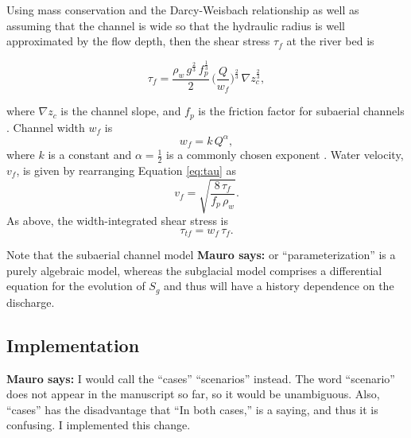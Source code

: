\documentclass[draft]{agujournal2019}
\newcommand{\mauro}[1]{{\textbf{\color{green}Mauro says:} \color{green} #1} }
\begin{document}
Using mass conservation and the Darcy-Weisbach relationship as well as assuming that the channel is wide so that the hydraulic radius is well approximated by the flow depth, then
the shear stress $\tau_f$ at the river bed is
\begin{linenomath*}
  \begin{equation}
    \label{eq:DW_tau}
    \tau_f=\frac{\rho_w\,g^{\frac{2}{3}}\,f_p^{\frac{1}{3}}}{2}\, \Big(\frac{Q}{w_f} \Big)^{\frac{2}{3}} \,\nabla z_c^{\frac{2}{3}},
  \end{equation}
\end{linenomath*}
where $\nabla z_c$ is the channel slope, and $f_p$ is the friction factor for subaerial channels \cite{tucker1997}.
Channel width $w_f$ is
\begin{equation}
  \label{eq:wcf}
  w_f = k \, Q^{\alpha},
\end{equation}
%
where $k$ is a constant and $\alpha=\frac{1}{2}$ is a commonly chosen exponent \cite{leopold1953}.
Water velocity, $v_f$, is given by rearranging Equation \ref{eq:tau} as
\begin{equation}
  \label{eq:vf}
  v_f = \sqrt{\frac{8\,\tau_f}{f_p\,\rho_w}}.
\end{equation}
%
As above, the width-integrated shear stress is
\begin{equation}
    \label{eq:tautf}
    \tau_{tf}=w_f\,\tau_f.
  \end{equation}

  Note that the subaerial channel model \mauro{or ``parameterization''} is a purely algebraic model, whereas the subglacial model comprises a differential equation for the evolution of $S_g$ and thus will have a history dependence on the discharge.

\subsection{Implementation}
\label{sect:imp}

\mauro{I would call the ``cases'' ``scenarios'' instead.  The word ``scenario'' does not appear in the manuscript so far, so it would be unambiguous.  Also, ``cases'' has the disadvantage that ``In both cases,'' is a saying, and thus it is confusing.  I implemented this change.}
\end{document}
